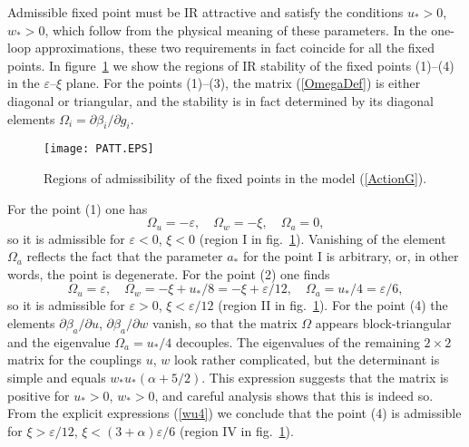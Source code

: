 \documentclass[12pt]{iopart}
\begin{document}
Admissible fixed point must be IR attractive and satisfy the conditions
$u_{*}>0$, $w_{*}>0$, which follow from the physical meaning of these
parameters. In the one-loop approximations, these two requirements in fact
coincide for all the fixed points. In figure~\ref{fig:patt} we show
the regions of IR stability of the fixed points (1)--(4) in the
$\varepsilon$--$\xi$ plane. For the points (1)--(3), the matrix
(\ref{OmegaDef}) is either diagonal
or triangular, and the stability is in fact determined by its diagonal
elements $\Omega_{i} = \partial\beta_{i}/\partial g_{i}$.

\begin{figure}
\begin{center}
\texttt{[image: PATT.EPS]}
\caption{\label{fig:patt}
Regions of admissibility of the fixed points in
the model (\protect\ref{ActionG}).}
\end{center}
\end{figure}


For the point (1) one has
\[ \Omega_{u} = -\varepsilon, \quad  \Omega_{w} = -\xi, \quad \Omega_{a} = 0, \]
so it is admissible for $\varepsilon<0$, $\xi<0$ (region I in
fig.~\ref{fig:patt}). Vanishing of the element $\Omega_{a}$ reflects the
fact that the parameter $a_{*}$ for the point I is arbitrary, or, in other
words, the point is degenerate.
For the point (2) one finds
\[ \Omega_{u} = \varepsilon, \quad
\Omega_{w} = -\xi+u_{*}/8 = -\xi+\varepsilon/12,
\quad \Omega_{a} = u_{*}/4 = \varepsilon/6, \]
so it is admissible for $\varepsilon>0$, $\xi<\varepsilon/12$
(region II in fig.~\ref{fig:patt}).
For the point (4) the elements $\partial\beta_{a}/\partial u$,
$\partial\beta_{a}/\partial w$ vanish, so that the matrix $\Omega$ appears
block-triangular and the eigenvalue $\Omega_{a} = u_{*}/4$ decouples.
The eigenvalues of the remaining $2\times2$ matrix for the couplings
$u$, $w$ look rather complicated, but the determinant is simple and equals
$w_{*}u_{*} (\alpha+5/2)$. This expression suggests that the matrix is
positive for $u_{*}>0$, $w_{*}>0$, and careful analysis shows that this
is indeed so. From the explicit expressions (\ref{wu4}) we conclude that
the point (4) is admissible for $\xi>\varepsilon/12$,
$\xi< (3+\alpha) \varepsilon/6$ (region IV in fig.~\ref{fig:patt}).
\end{document}
